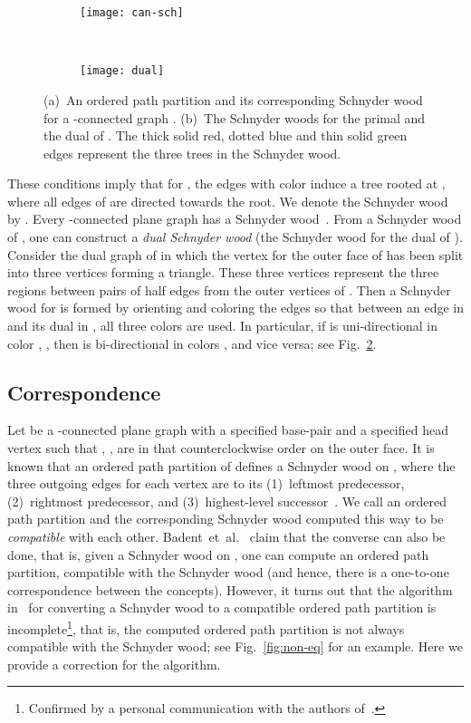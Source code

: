 \documentclass{article}
\newcommand{\df}{\textit}
\begin{document}
\begin{figure}[t]
\centering
  \begin{subfigure}[t]{.45\textwidth}
    \centering
    \texttt{[image: can-sch]}
    \caption{}
    \label{fig:can-schB}
  \end{subfigure}
~
  \begin{subfigure}[t]{.45\textwidth}
    \centering
    \texttt{[image: dual]}
	\caption{}
    \label{fig:can-schA}
  \end{subfigure}
\caption{(a)~An ordered path partition
and its corresponding Schnyder wood for a -connected graph .
 (b)~The Schnyder woods for the primal and the dual of . The thick solid red, dotted blue and thin
 solid green edges represent the three trees in the Schnyder wood.}
\label{fig:can-sch}
\end{figure}



These conditions imply that for , the edges with color 
induce a tree  rooted at , where all edges of  are directed towards the root.
We denote the Schnyder wood by .
Every -connected plane graph  has a Schnyder wood~\cite{FZ08,BF12}.
From a Schnyder wood of
, one can construct a \df{dual Schnyder wood} (the Schnyder wood for the
dual of ). Consider the dual graph  of  in which the vertex
for the outer face of  has been split into three vertices forming a triangle. These three vertices
represent the three regions between pairs of half edges from the outer vertices of . Then a Schnyder
wood for  is formed by orienting and coloring the edges so that between an edge  in 
and its dual  in , all three colors  are used. In particular, if  is uni-directional
in color , , then  is bi-directional in colors ,  and vice versa;
see Fig.~\ref{fig:can-schA}.


\subsection{Correspondence}
\label{subsect:corr}

Let  be a -connected plane graph with a specified base-pair  and a specified head
vertex  such that , ,  are in that counterclockwise order on the outer face.
It is known that an ordered path partition of  defines a Schnyder wood on , where the three outgoing
edges for each vertex are to its (1)~leftmost predecessor, (2)~rightmost predecessor, and
(3)~highest-level successor~\cite{FZ08,BF12}. We call an ordered path partition and the corresponding Schnyder
wood computed this way to be \df{compatible} with each other.
Badent~et~al.~\cite{BBC11} claim that the converse can also be done, that is, given a Schnyder wood on ,
one can compute an ordered path partition, compatible with the Schnyder wood (and hence,
there is a one-to-one correspondence between the concepts).
However, it turns out that the algorithm in~\cite{BBC11} for converting a Schnyder wood to a compatible ordered path partition is incomplete\footnote{Confirmed by a personal communication with the authors of~\cite{BBC11}.}, that is, the computed ordered path partition is not always
compatible with the Schnyder wood; see Fig.~\ref{fig:non-eq}
for an example. Here we provide a correction for the algorithm.
\end{document}
